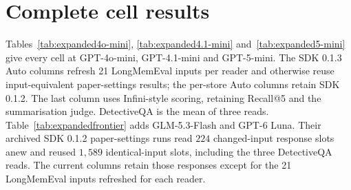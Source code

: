 \documentclass{article}
\begin{document}
\section{Complete cell results}\label{app:expanded}

Tables~\ref{tab:expanded4o-mini}, \ref{tab:expanded4.1-mini} and~\ref{tab:expanded5-mini} give every cell at GPT-4o-mini, GPT-4.1-mini and GPT-5-mini. The SDK 0.1.3 Auto columns refresh 21 LongMemEval inputs per reader and otherwise reuse input-equivalent paper-settings results; the per-store Auto columns retain SDK 0.1.2. The last column uses Infini-style scoring, retaining Recall@5 and the summarisation judge. DetectiveQA is the mean of three reads. Table~\ref{tab:expandedfrontier} adds GLM-5.3-Flash and GPT-6 Luna. Their archived SDK 0.1.2 paper-settings runs read $224$ changed-input response slots anew and reused $1{,}589$ identical-input slots, including the three DetectiveQA reads. The current columns retain those responses except for the 21 LongMemEval inputs refreshed for each reader.
\end{document}
